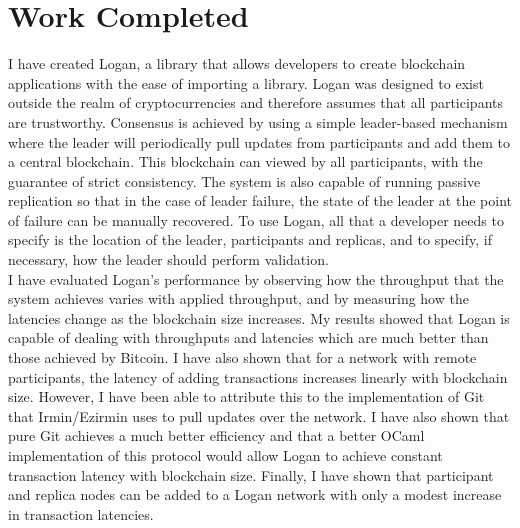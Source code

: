 \documentclass[12pt,a4paper,twoside,openright]{report}
\begin{document}
	\section{Work Completed}
	I have created Logan, a library that allows developers to create blockchain applications with the ease of importing a library.
	Logan was designed to exist outside the realm of cryptocurrencies and therefore assumes that all participants are trustworthy.
	Consensus is achieved by using a simple leader-based mechanism where the leader will periodically pull updates from participants and add them to a central blockchain.
	This blockchain can viewed by all participants, with the guarantee of strict consistency.
	The system is also capable of running passive replication so that in the case of leader failure, the state of the leader at the point of failure can be manually recovered.
	To use Logan, all that a developer needs to specify is the location of the leader, participants and replicas, and to specify, if necessary, how the leader should perform validation.\\
	
	I have evaluated Logan's performance by observing how the throughput that the system achieves varies with applied throughput, and by measuring how the latencies change as the blockchain size increases.
	My results showed that Logan is capable of dealing with throughputs and latencies which are much better than those achieved by Bitcoin.
	I have also shown that for a network with remote participants, the latency of adding transactions increases linearly with blockchain size. 
	However, I have been able to attribute this to the implementation of Git that Irmin/Ezirmin uses to pull updates over the network. 
	I have also shown that pure Git achieves a much better efficiency and that a better OCaml implementation of this protocol would allow Logan to achieve constant transaction latency with blockchain size.
	Finally, I have shown that participant and replica nodes can be added to a Logan network with only a modest increase in transaction latencies.
\end{document}
